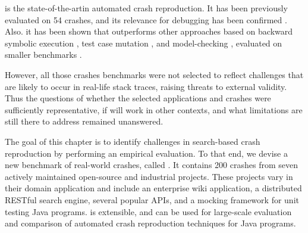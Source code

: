 



\evocrash is the state-of-the-artin automated crash reproduction. It has been previously evaluated on 54 crashes\cite{soltani2017}, and its relevance for debugging has been confirmed \cite{Soltani2018a}.
Also. it has been shown that \evocrash outperforms other approaches based on backward symbolic execution \cite{Chen2015}, test case mutation \cite{Xuan2015}, and model-checking \cite{Nayrolles2017}, evaluated on smaller benchmarks \cite{Soltani2018a}.

However, all those crashes benchmarks were not selected to reflect challenges that are likely to occur in real-life stack traces, raising threats to external validity.
Thus the questions of whether the selected applications and crashes were sufficiently representative, if \evocrash will work in other contexts, and what limitations are still there to address remained unanswered.

The goal of this chapter is to identify challenges in search-based crash reproduction by performing an empirical evaluation.
To that end, we devise a new benchmark of real-world crashes, called \crashpack.
It contains 200 crashes from seven actively maintained open-source and industrial projects.
These projects vary in their domain application and include an enterprise wiki application, a distributed RESTful search engine, several popular APIs, and a mocking framework for unit testing Java programs. 
\crashpack is extensible, and can be used for large-scale evaluation and comparison of automated crash reproduction techniques for Java programs.

